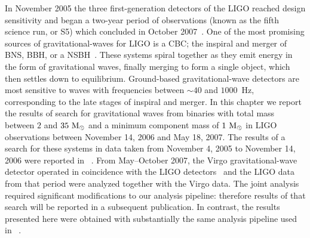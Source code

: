 \def\NSBHtripleCalErr{\ensuremath{24\%}}
\def\NSBHHoneLoneCalErr{\ensuremath{22\%}}
\def\NSBHHtwoLoneCalErr{\ensuremath{30\%}}

\def\NSBHtripleMonErr{\ensuremath{3\%}}
\def\NSBHHoneLoneMonErr{\ensuremath{7\%}}
\def\NSBHHtwoLoneMonErr{\ensuremath{10\%}}

\def\NSBHtripleWavErr{\ensuremath{32\%}}
\def\NSBHHoneLoneWavErr{\ensuremath{32\%}}
\def\NSBHHtwoLoneWavErr{\ensuremath{36\%}}

\def\NSBHtripleGDErr{\ensuremath{13\%}}
\def\NSBHHoneLoneGDErr{\ensuremath{13\%}}
\def\NSBHHtwoLoneGDErr{\ensuremath{18\%}}

\def\NSBHtripleGMErr{\ensuremath{18\%}}
\def\NSBHHoneLoneGMErr{\ensuremath{19\%}}
\def\NSBHHtwoLoneGMErr{\ensuremath{19\%}}


In November 2005 the three first-generation detectors of the \ac{LIGO} reached
design sensitivity and began a two-year period of observations (known as the
fifth science run, or S5) which concluded in October 
2007~\cite{abbott:2007kva}.  One of the most promising sources of 
gravitational-waves for LIGO is a \ac{CBC}; the inspiral and merger of 
\ac{BNS}, \ac{BBH}, or a \ac{NSBH}~\cite{LIGOS1iul,LIGOS2iul,LIGOS2macho,
LIGOS2bbh,LIGOS3S4all,Collaboration:2009tt}. These systems spiral together as
they emit energy in the form of gravitational waves, finally merging to form a 
single object, which then settles down to equilibrium. Ground-based 
gravitational-wave detectors are most sensitive to waves with frequencies 
between $\sim 40$ and $1000$~Hz, corresponding to the late stages of inspiral 
and merger. In this chapter we report the results of search for 
gravitational waves from binaries with total mass between $2$ and $35~\mathrm{M_\odot}$ 
and a minimum component mass of $1~\mathrm{M_\odot}$ in LIGO observations between November 
14, 2006 and May 18, 2007. The results of a search for these systems in data 
taken from November 4, 2005 to November 14, 2006 were reported in 
~\cite{Collaboration:2009tt}. From May--October 2007, the Virgo 
gravitational-wave detector operated in coincidence with the \ac{LIGO} 
detectors~\cite{0264-9381-23-19-S01} and the \ac{LIGO} data from that period 
were analyzed together with the Virgo data. The joint analysis required 
significant modifications to our analysis pipeline: therefore results of that 
search will be reported in a subsequent publication. In contrast, the results 
presented here were obtained with substantially the same analysis pipeline used 
in ~\cite{Collaboration:2009tt}.  

